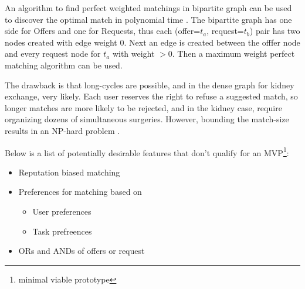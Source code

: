 \documentclass[main.tex]{subfiles}
\begin{document}
An algorithm to find perfect weighted matchings in bipartite graph can be used to discover the optimal match in polynomial time \cite{Bir}. The bipartite graph has one side for Offers and one for Requests, thus each (offer=$t_a$, request=$t_b$) pair has two nodes created with edge weight $0$. Next an edge is created between the offfer node and every request node for $t_a$ with weight $> 0$. Then a maximum weight perfect matching algorithm can be used.

The drawback is that long-cycles are possible, and in the dense graph for kidney exchange, very likely. Each user reserves the right to refuse a suggested match, so longer matches are more likely to be rejected, and in the kidney case, require organizing dozens of simultaneous surgeries. However, bounding the match-size results in an NP-hard problem \cite{Bir}.

Below is a list of potentially desirable features that don't qualify for an MVP\footnote{minimal viable prototype}:
\begin{itemize}
  \item Reputation biased matching
  \item Preferences for matching based on
    \begin{itemize}
      \item User preferences
      \item Task prefreences
    \end{itemize}
  \item ORs and ANDs of offers or request
\end{itemize}
\end{document}
